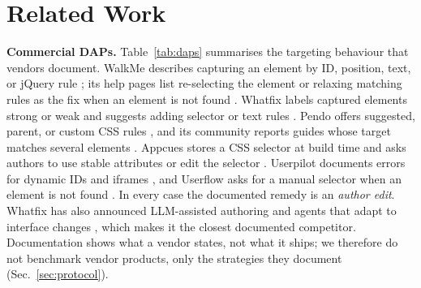 \documentclass[conference]{IEEEtran}
\begin{document}
\section{Related Work}\label{sec:related}
\textbf{Commercial DAPs.}
Table~\ref{tab:daps} summarises the targeting behaviour that vendors document. WalkMe describes capturing an element by ID, position, text, or jQuery rule \cite{walkme_what}; its help pages list re-selecting the element or relaxing matching rules as the fix when an element is not found \cite{walkme_cant_find,walkme_advanced}. Whatfix labels captured elements strong or weak and suggests adding selector or text rules \cite{whatfix_visual}. Pendo offers suggested, parent, or custom CSS rules \cite{pendo_css}, and its community reports guides whose target matches several elements \cite{pendo_community}. Appcues stores a CSS selector at build time and asks authors to use stable attributes or edit the selector \cite{appcues_selectors,appcues_check}. Userpilot documents errors for dynamic IDs and iframes \cite{userpilot_select,userpilot_errors}, and Userflow asks for a manual selector when an element is not found \cite{userflow_tooltip}. In every case the documented remedy is an \emph{author edit}. Whatfix has also announced LLM-assisted authoring and agents that adapt to interface changes \cite{whatfix_ai,itbrief_whatfix}, which makes it the closest documented competitor. Documentation shows what a vendor states, not what it ships; we therefore do not benchmark vendor products, only the strategies they document (Sec.~\ref{sec:protocol}).
\end{document}
